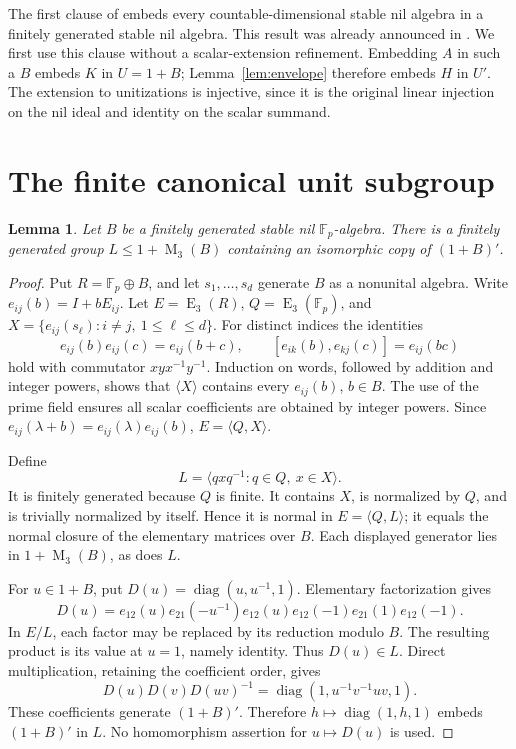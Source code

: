 \documentclass[11pt]{article}
\newtheorem{lemma}[theorem]{Lemma}
\theoremstyle{definition}
\newcommand{\Fp}{\mathbb F_p}
\newcommand{\Mat}{\operatorname{M}}
\newcommand{\diag}{\operatorname{diag}}
\newcommand{\E}{\operatorname{E}}
\begin{document}
The first clause of \cite[Theorem 4.3]{AAJZ} embeds every countable-dimensional
stable nil algebra in a finitely generated stable nil algebra.
This result was already announced in \cite[Theorem 6]{AAJZshort}.
We first use this clause without a scalar-extension refinement.
Embedding \(A\) in such a \(B\) embeds \(K\) in \(U=1+B\);
Lemma~\ref{lem:envelope} therefore embeds \(H\) in \(U'\).
The extension to unitizations is injective, since it is the original
linear injection on the nil ideal and identity on the scalar summand.

\section{The finite canonical unit subgroup}

\begin{lemma}\label{lem:elementary}
Let \(B\) be a finitely generated stable nil \(\Fp\)-algebra.
There is a finitely generated group \(L\leq1+\Mat_3(B)\) containing
an isomorphic copy of \((1+B)'\).
\end{lemma}
\begin{proof}
Put \(R=\Fp\oplus B\), and let \(s_1,\ldots,s_d\) generate \(B\) as a
nonunital algebra. Write \(e_{ij}(b)=I+bE_{ij}\). Let
\(E=\E_3(R)\), \(Q=\E_3(\Fp)\), and
\(X=\{e_{ij}(s_\ell):i\ne j,\ 1\leq\ell\leq d\}\).
For distinct indices the identities
\[
 e_{ij}(b)e_{ij}(c)=e_{ij}(b+c),\qquad
 [e_{ik}(b),e_{kj}(c)]=e_{ij}(bc)
\]
hold with commutator \(xyx^{-1}y^{-1}\).
Induction on words, followed by addition and integer powers, shows that
\(\langle X\rangle\) contains every \(e_{ij}(b)\), \(b\in B\).
The use of the prime field ensures all scalar coefficients are obtained
by integer powers. Since
\(e_{ij}(\lambda+b)=e_{ij}(\lambda)e_{ij}(b)\), \(E=\langle Q,X\rangle\).

Define
\[
 L=\langle qxq^{-1}:q\in Q,\ x\in X\rangle.
\]
It is finitely generated because \(Q\) is finite. It contains \(X\),
is normalized by \(Q\), and is trivially normalized by itself.
Hence it is normal in \(E=\langle Q,L\rangle\); it equals the normal
closure of the elementary matrices over \(B\). Each displayed generator
lies in \(1+\Mat_3(B)\), as does \(L\).

For \(u\in1+B\), put \(D(u)=\diag(u,u^{-1},1)\). Elementary
factorization gives
\[
 D(u)=e_{12}(u)e_{21}(-u^{-1})e_{12}(u)
             e_{12}(-1)e_{21}(1)e_{12}(-1).
\]
In \(E/L\), each factor may be replaced by its reduction modulo \(B\).
The resulting product is its value at \(u=1\), namely identity.
Thus \(D(u)\in L\). Direct multiplication, retaining the coefficient order,
gives
\[
 D(u)D(v)D(uv)^{-1}=\diag(1,u^{-1}v^{-1}uv,1).
\]
These coefficients generate \((1+B)'\). Therefore
\(h\mapsto\diag(1,h,1)\) embeds \((1+B)'\) in \(L\).
No homomorphism assertion for \(u\mapsto D(u)\) is used.
\end{proof}
\end{document}

